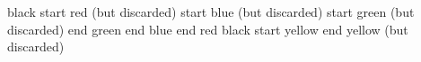 \documentclass{article}
\begin{document}
black
\newpage
\AtBeginShipoutNext{\AtBeginShipoutDiscard}
{\color{red}
 start red (but discarded)
\newpage
 \AtBeginShipoutNext{\AtBeginShipoutDiscard}
 {\color{blue}
  start blue (but discarded)
\newpage
  \AtBeginShipoutNext{\AtBeginShipoutDiscard}
  {\color{green}
   start green (but discarded)
\newpage
   end green}
\newpage
  end blue}
\newpage
 end red}
\newpage
black
\newpage
{\color{yellow}
 start yellow
\newpage
 \AtBeginShipoutNext{\AtBeginShipoutDiscard}
 end yellow (but discarded)}
\end{document}
